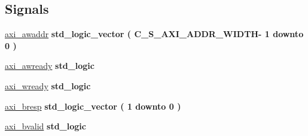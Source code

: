 \subsection*{Signals}
 \begin{DoxyCompactItemize}
\item 
\hypertarget{group___a_x_i-internal_gac022af52d7126cf515130cdd10e089fc}{\hyperlink{group___a_x_i-internal_gac022af52d7126cf515130cdd10e089fc}{axi\+\_\+awaddr} {\bfseries \textcolor{vhdlchar}{std\+\_\+logic\+\_\+vector}\textcolor{vhdlchar}{ }\textcolor{vhdlchar}{(}\textcolor{vhdlchar}{ }\textcolor{vhdlchar}{ }\textcolor{vhdlchar}{ }\textcolor{vhdlchar}{ }\textcolor{vhdlchar}{C\+\_\+\+S\+\_\+\+A\+X\+I\+\_\+\+A\+D\+D\+R\+\_\+\+W\+I\+D\+T\+H}\textcolor{vhdlchar}{-\/}\textcolor{vhdlchar}{ } \textcolor{vhdldigit}{1} \textcolor{vhdlchar}{ }\textcolor{vhdlchar}{downto}\textcolor{vhdlchar}{ }\textcolor{vhdlchar}{ } \textcolor{vhdldigit}{0} \textcolor{vhdlchar}{ }\textcolor{vhdlchar}{)}\textcolor{vhdlchar}{ }} }\label{group___a_x_i-internal_gac022af52d7126cf515130cdd10e089fc}

\item 
\hypertarget{group___a_x_i-internal_gabe920675e5bffe2b708237782acd713d}{\hyperlink{group___a_x_i-internal_gabe920675e5bffe2b708237782acd713d}{axi\+\_\+awready} {\bfseries \textcolor{vhdlchar}{std\+\_\+logic}\textcolor{vhdlchar}{ }} }\label{group___a_x_i-internal_gabe920675e5bffe2b708237782acd713d}

\item 
\hypertarget{group___a_x_i-internal_ga65364960779319dfc2c67e7d943d0499}{\hyperlink{group___a_x_i-internal_ga65364960779319dfc2c67e7d943d0499}{axi\+\_\+wready} {\bfseries \textcolor{vhdlchar}{std\+\_\+logic}\textcolor{vhdlchar}{ }} }\label{group___a_x_i-internal_ga65364960779319dfc2c67e7d943d0499}

\item 
\hypertarget{group___a_x_i-internal_gae5e5ea90e34af927db9507875d261a1a}{\hyperlink{group___a_x_i-internal_gae5e5ea90e34af927db9507875d261a1a}{axi\+\_\+bresp} {\bfseries \textcolor{vhdlchar}{std\+\_\+logic\+\_\+vector}\textcolor{vhdlchar}{ }\textcolor{vhdlchar}{(}\textcolor{vhdlchar}{ }\textcolor{vhdlchar}{ } \textcolor{vhdldigit}{1} \textcolor{vhdlchar}{ }\textcolor{vhdlchar}{downto}\textcolor{vhdlchar}{ }\textcolor{vhdlchar}{ } \textcolor{vhdldigit}{0} \textcolor{vhdlchar}{ }\textcolor{vhdlchar}{)}\textcolor{vhdlchar}{ }} }\label{group___a_x_i-internal_gae5e5ea90e34af927db9507875d261a1a}

\item 
\hypertarget{group___a_x_i-internal_gaf832611b20471b9b894f1c7b2a610c42}{\hyperlink{group___a_x_i-internal_gaf832611b20471b9b894f1c7b2a610c42}{axi\+\_\+bvalid} {\bfseries \textcolor{vhdlchar}{std\+\_\+logic}\textcolor{vhdlchar}{ }} }\label{group___a_x_i-internal_gaf832611b20471b9b894f1c7b2a610c42}


\end{DoxyCompactItemize}
